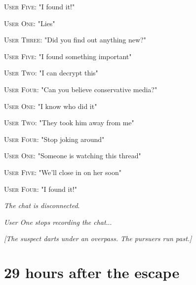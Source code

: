 \documentclass{report}
\begin{document}
\textsc{User Five}: "I found it!" 

\textsc{User One}: "Lies" 

\textsc{User Three}: "Did you find out anything new?" 

\textsc{User Five}: "I found something important" 

\textsc{User Two}: "I can decrypt this" 

\textsc{User Four}: "Can you believe conservative media?" 

\textsc{User One}: "I know who did it" 

\textsc{User Two}: "They took him away from me" 

\textsc{User Four}: "Stop joking around" 

\textsc{User One}: "Someone is watching this thread" 

\textsc{User Five}: "We'll close in on her soon" 

\textsc{User Four}: "I found it!" 

\textit{The chat is disconnected}. 

\textit{User One stops recording the chat}...

\textit{[The suspect darts under an overpass. The pursuers run past.]}


\section*{29 \small{hours after the escape}}
\end{document}
